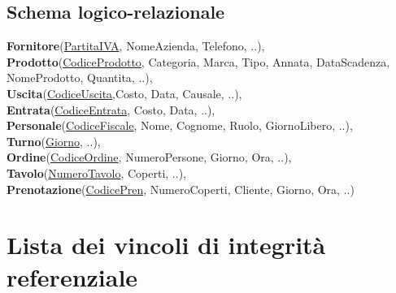 \subsection{Schema logico-relazionale} %
\textbf{Fornitore}(\underline{PartitaIVA}, NomeAzienda, Telefono, ..), \\ \smallskip
\textbf{Prodotto}(\underline{CodiceProdotto}, Categoria, Marca, Tipo, Annata, DataScadenza, NomeProdotto, Quantita, ..), \\ \smallskip
\textbf{Uscita}(\underline{CodiceUscita},Costo, Data, Causale, ..), \\ \smallskip
\textbf{Entrata}(\underline{CodiceEntrata}, Costo, Data, ..), \\ \smallskip
\textbf{Personale}(\underline{CodiceFiscale}, Nome, Cognome, Ruolo, GiornoLibero, ..), \\ \smallskip
\textbf{Turno}(\underline{Giorno}, ..), \\ \smallskip
\textbf{Ordine}(\underline{CodiceOrdine}, NumeroPersone, Giorno, Ora, ..), \\ \smallskip %
\textbf{Tavolo}(\underline{NumeroTavolo}, Coperti, ..), \\ \smallskip
\textbf{Prenotazione}(\underline{CodicePren}, NumeroCoperti, Cliente, Giorno, Ora, ..) %

\section{Lista dei vincoli di integrità referenziale}

